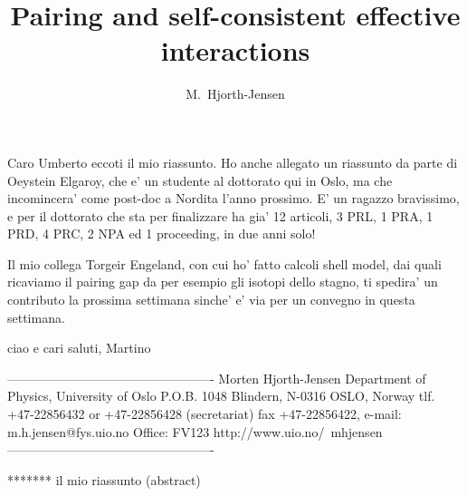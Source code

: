 Caro Umberto eccoti il mio riassunto.
Ho anche allegato un riassunto da parte di Oeystein Elgaroy, che
e' un studente al dottorato qui in Oslo, ma che incomincera' come
post-doc a Nordita l'anno prossimo. E' un ragazzo bravissimo,
e per il dottorato che sta per finalizzare ha gia' 12 articoli,
3 PRL, 1 PRA, 1 PRD, 4 PRC,  2 NPA ed 1 proceeding,
in due anni solo!

Il mio collega Torgeir Engeland, con cui ho' fatto calcoli
shell model, dai quali ricaviamo il pairing gap da per esempio
gli isotopi dello stagno, ti spedira' un contributo la prossima settimana
sinche' e' via per un convegno in questa settimana.

ciao e cari saluti,
Martino


-------------------------------------------------
 Morten Hjorth-Jensen
 Department of Physics, University of Oslo
 P.O.B. 1048 Blindern, N-0316 OSLO, Norway
 tlf. +47-22856432 or +47-22856428 (secretariat)
 fax  +47-22856422, e-mail: m.h.jensen@fys.uio.no
 Office: FV123
 http://www.uio.no/~mhjensen
-------------------------------------------------
 
*******   il mio riassunto (abstract)




\title{Pairing and self-consistent effective interactions}

\author{M.\ Hjorth-Jensen}

\address{Department of Physics, University of Oslo, N-0316 Oslo, Norway\\
         e-mail: mhjensen@fys.uio.no}

\maketitle










